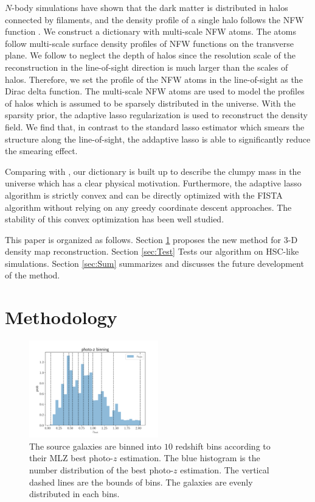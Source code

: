 \documentclass[twocolumn]{aastex62}
\begin{document}
$N$-body simulations have shown that the dark matter is distributed in halos connected by filaments, and the density 
profile of a single halo follows the NFW function \citep{halo-NFW1997ApJ}.
We construct a dictionary with multi-scale NFW atoms.  The atoms follow multi-scale surface density profiles of NFW 
functions \citep{haloModel-TJ2003-3pt} on the transverse plane. We follow \citet{LSS-massMap-Glimpse3D-Leonard2014} 
to neglect the depth of halos since the resolution scale of the reconstruction in the line-of-sight direction is much 
larger than the scales of halos. Therefore, we set the profile of the NFW atoms in the line-of-sight as the Dirac delta 
function. The multi-scale NFW atoms are used to model the profiles of halos which is assumed to be sparsely distributed 
in the universe. With the sparsity prior, the adaptive lasso regularization \citep{AdaLASSO-Zou2006} is used to reconstruct 
the density field. We find that, in contrast to the standard lasso estimator which smears the structure along the line-of-sight,
the addaptive lasso is able to significantly reduce the smearing effect.

Comparing with \citet{LSS-massMap-Glimpse3D-Leonard2014}, our dictionary is built up to describe the clumpy mass 
in the universe which has a clear physical motivation. Furthermore, the adaptive lasso algorithm is strictly convex and 
can be directly optimized with the FISTA algorithm \citep{FISTA-Beck2009} without relying on any greedy coordinate 
descent approaches.  The stability of this convex optimization has been well studied.

This paper is organized as follows.
Section \ref{sec:Method} proposes the new method for $3$-D density map reconstruction.
Section \ref{sec:Test} Tests our algorithm on HSC-like simulations.
Section \ref{sec:Sum} summarizes and discusses the future development of the method.

\section{Methodology}
\label{sec:Method}

\begin{figure}[!t]
 \centering
 \includegraphics[width=0.5\textwidth]{photo-z_binning.pdf}
 \caption{The source galaxies are binned into $10$ redshift bins according to their MLZ best photo-$z$ estimation.
        The blue histogram is the number distribution of the best photo-$z$ estimation. The vertical dashed lines
        are the bounds of bins. The galaxies are evenly distributed in each bins.} \label{fig-bestpz}
\end{figure}
\end{document}
